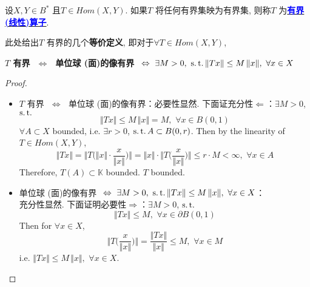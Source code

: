 	\begin{defn}\label{def 4.1.3}
		设$X , Y \in B^*$ 且$T \in Hom(X , Y)$. 如果$T$ 将任何有界集映为有界集, 则称$T$ 为\underline{\textcolor{blue}{\textbf{有界 (线性)算子}}}. 
		
		\vspace*{4em}
		
		\begin{rmk}
			此处给出$T$ 有界的几个\textbf{等价定义}, 即对于$\forall T \in Hom(X , Y)$, 
			\begin{center}
				\textbf{$T$ 有界 $\,\, \Leftrightarrow \,\, $ 单位球 (面)的像有界 $\,\, \Leftrightarrow \,\, \exists M > 0 , \,\, \operatorname{s.t.} \Vert T x \Vert \leq M \, \Vert x \Vert , \,\, \forall x \in X$}
			\end{center}
			
			\vspace*{2em}
			
			\begin{proof}
				\begin{itemize}
					\item $T$ 有界 $\,\, \Leftrightarrow \,\, $ 单位球 (面)的像有界：必要性显然. 下面证充分性$\Leftarrow$：$\exists M > 0$, $\operatorname{s.t.}$
					\[ \Vert Tx \Vert \leq M \, \Vert x \Vert = M , \,\, \forall x \in B(0 , 1) \]
					$\forall A \subset X$ bounded, i.e. $\exists r > 0$, $\operatorname{s.t.} A \subset B(0 , r)$. Then by the linearity of $T \in Hom(X , Y)$, 
					\[ \Vert T x \Vert 
					= \Big\Vert T \Big( \Vert x \Vert \cdot \frac{x}{\Vert x \Vert} \Big) \Big\Vert 
					= \Vert x \Vert \cdot \Big\Vert T \Big( \frac{x}{\Vert x \Vert} \Big) \Big\Vert 
					\leq r \cdot M < \infty , \,\, \forall x \in A \]
					Therefore, $T(A) \subset \mathbb{K}$ bounded. $T$ bounded. 
					
					\vspace*{8em}
					
					\item 单位球 (面)的像有界 $\,\, \Leftrightarrow \,\, \exists M > 0 , \,\, \operatorname{s.t.} \Vert T x \Vert \leq M \, \Vert x \Vert , \,\, \forall x \in X$：\\
					充分性显然. 下面证明必要性$\Rightarrow$：$\exists M > 0$, $\operatorname{s.t.}$
					\[ \Vert Tx \Vert \leq M , \,\, \forall x \in \partial B(0 , 1) \]
					Then for $\forall x \in X$, 
					\[ \Big\Vert T\Big( \frac{x}{\Vert x \Vert} \Big) \Big\Vert 
					= \frac{\Vert Tx \Vert}{\Vert x \Vert}
					\leq M , \,\, \forall x \in M \]
					i.e. $\Vert Tx \Vert \leq M \, \Vert x \Vert , \,\, \forall x \in X$.
				\end{itemize}
			\end{proof}
		\end{rmk}
	\end{defn}


	\ifx\allfiles\undefined

\fi